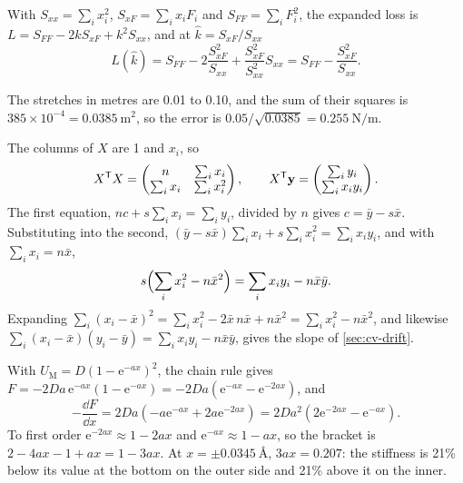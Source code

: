 \label{sec:lo-solutions}

With $S_{xx} = \sum_ix_i^2$, $S_{xF} =
\sum_ix_iF_i$ and $S_{FF} = \sum_iF_i^2$, the expanded loss is $L = S_{FF}
- 2kS_{xF} + k^2S_{xx}$, and at $\hat k = S_{xF}/S_{xx}$
\begin{equation*}
   L(\hat k) = S_{FF} - 2\frac{S_{xF}^2}{S_{xx}} + \frac{S_{xF}^2}{S_{xx}^2}
   S_{xx} = S_{FF} - \frac{S_{xF}^2}{S_{xx}} .
\end{equation*}

The stretches in metres are 0.01 to 0.10, and
the sum of their squares is $385\times10^{-4} =
\SI{0.0385}{\metre\squared}$, so the error is $0.05/\sqrt{0.0385} =
\SI{0.255}{\newton\per\metre}$.

The columns of $X$ are 1 and $x_i$, so
\begin{equation*}
   X^{\mathsf T}X = \begin{pmatrix} n & \sum_ix_i\\ \sum_ix_i &
   \sum_ix_i^2\end{pmatrix} , \qquad
   X^{\mathsf T}\bm{\mathrm{y}} = \begin{pmatrix}\sum_iy_i\\ \sum_ix_iy_i
   \end{pmatrix} .
\end{equation*}
The first equation, $nc + s\sum_ix_i = \sum_iy_i$, divided by $n$ gives
$c = \bar y - s\bar x$. Substituting into the second, $(\bar y - s\bar
x)\sum_ix_i + s\sum_ix_i^2 = \sum_ix_iy_i$, and with $\sum_ix_i = n\bar x$,
\begin{equation*}
   s\Bigl(\sum_ix_i^2 - n\bar x^2\Bigr) = \sum_ix_iy_i - n\bar x\bar y .
\end{equation*}
Expanding $\sum_i(x_i - \bar x)^2 = \sum_ix_i^2 - 2\bar x\,n\bar x + n\bar
x^2 = \sum_ix_i^2 - n\bar x^2$, and likewise $\sum_i(x_i - \bar x)(y_i -
\bar y) = \sum_ix_iy_i - n\bar x\bar y$, gives the slope of
\cref{sec:cv-drift}.

With $U_{\mathrm M} = D(1 -
\mathrm{e}^{-ax})^2$, the chain rule gives $F = -2Da\,\mathrm{e}^{-ax}(1 -
\mathrm{e}^{-ax}) = -2Da(\mathrm{e}^{-ax} - \mathrm{e}^{-2ax})$, and
\begin{equation*}
   -\frac{\dd F}{\dd x} = 2Da(-a\mathrm{e}^{-ax} + 2a\mathrm{e}^{-2ax})
   = 2Da^2(2\mathrm{e}^{-2ax} - \mathrm{e}^{-ax}) .
\end{equation*}
To first order $\mathrm{e}^{-2ax} \approx 1 - 2ax$ and $\mathrm{e}^{-ax}
\approx 1 - ax$, so the bracket is $2 - 4ax - 1 + ax = 1 - 3ax$. At $x =
\pm\SI{0.0345}{\angstrom}$, $3ax = 0.207$: the stiffness is 21\% below its
value at the bottom on the outer side and 21\% above it on the inner.

